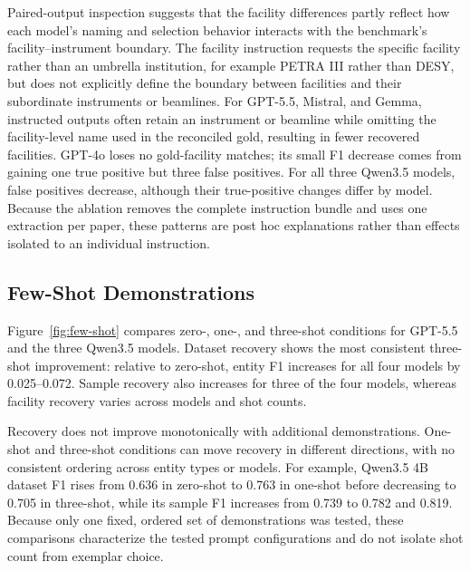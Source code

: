 Paired-output inspection suggests that the facility differences partly reflect
how each model's naming and selection behavior interacts with the benchmark's
facility--instrument boundary. The facility instruction requests the specific
facility rather than an umbrella institution, for example PETRA III rather
than DESY, but does not explicitly define the boundary between facilities and
their subordinate instruments or beamlines. For GPT-5.5, Mistral, and Gemma,
instructed outputs often retain an instrument or beamline while omitting the
facility-level name used in the reconciled gold, resulting in fewer recovered
facilities. GPT-4o loses no gold-facility matches; its small F1 decrease comes
from gaining one true positive but three false positives. For all three
Qwen3.5 models, false positives decrease, although their true-positive changes
differ by model. Because the ablation removes the complete instruction bundle
and uses one extraction per paper, these patterns are post hoc explanations
rather than effects isolated to an individual instruction.

\subsection{Few-Shot Demonstrations}
\label{sec:few-shot}

Figure~\ref{fig:few-shot} compares zero-, one-, and three-shot conditions for
GPT-5.5 and the three Qwen3.5 models. Dataset
recovery shows the most consistent three-shot improvement: relative to
zero-shot, entity F1 increases for all four models by 0.025--0.072. Sample
recovery also increases for three of the four models, whereas facility recovery
varies across models and shot counts.

Recovery does not improve monotonically with additional demonstrations.
One-shot and three-shot conditions can move recovery in different directions,
with no consistent ordering across entity types or models. For example,
Qwen3.5 4B dataset F1 rises from 0.636 in zero-shot to 0.763 in one-shot before
decreasing to 0.705 in three-shot, while its sample F1 increases from 0.739 to
0.782 and 0.819. Because only one fixed, ordered set of demonstrations was tested, 
these comparisons characterize the tested prompt configurations and do not isolate 
shot count from exemplar choice.
